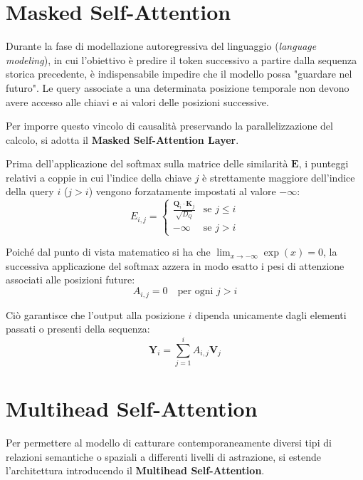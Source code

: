 ﻿\documentclass[11pt, a4paper]{article}
\begin{document}
\newpage

\section{Masked Self-Attention}

Durante la fase di modellazione autoregressiva del linguaggio (\emph{language modeling}), in cui l'obiettivo è predire il token successivo a partire dalla sequenza storica precedente, è indispensabile impedire che il modello possa "guardare nel futuro". Le query associate a una determinata posizione temporale non devono avere accesso alle chiavi e ai valori delle posizioni successive.


Per imporre questo vincolo di causalità preservando la parallelizzazione del calcolo, si adotta il \textbf{Masked Self-Attention Layer}.

Prima dell'applicazione del softmax sulla matrice delle similarità $\bm{E}$, i punteggi relativi a coppie in cui l'indice della chiave $j$ è strettamente maggiore dell'indice della query $i$ ($j > i$) vengono forzatamente impostati al valore $-\infty$:
\[ E_{i,j} = \begin{cases}
\frac{\bm{Q}_i \cdot \bm{K}_j}{\sqrt{D_Q}} & \text{se } j \le i \\
-\infty & \text{se } j > i
\end{cases} \]

Poiché dal punto di vista matematico si ha che $\lim_{x \to -\infty} \exp(x) = 0$, la successiva applicazione del softmax azzera in modo esatto i pesi di attenzione associati alle posizioni future:
\[ A_{i,j} = 0 \quad \text{per ogni } j > i \]

Ciò garantisce che l'output alla posizione $i$ dipenda unicamente dagli elementi passati o presenti della sequenza:
\[ \bm{Y}_i = \sum_{j=1}^{i} A_{i,j} \bm{V}_j \]

\newpage

\section{Multihead Self-Attention}

Per permettere al modello di catturare contemporaneamente diversi tipi di relazioni semantiche o spaziali a differenti livelli di astrazione, si estende l'architettura introducendo il \textbf{Multihead Self-Attention}.
\end{document}
